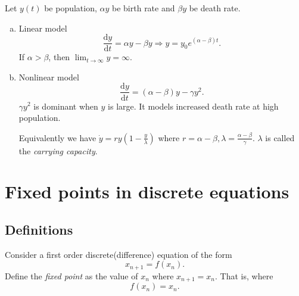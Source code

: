 \documentclass[10pt]{article}
\begin{document}
    \begin{example}
        Let $ y(t) $ be population, $ \alpha y $ be birth rate and $ \beta y $ be death rate.
        \begin{enumerate}[(a)]
            \item Linear model
            \[
                \frac{\mathrm{d}y}{\mathrm{d}t}=\alpha y-\beta y \Rightarrow y=y_{0}e^{(\alpha-\beta)t} 
            .\]
            If $ \alpha>\beta $, then $ \lim_{t \to \infty} y=\infty  $.
            \item Nonlinear model 
            \[
                \frac{\mathrm{d}y}{\mathrm{d}t} =(\alpha-\beta)y-\gamma y^2
            .\]
            $ \gamma y^2 $ is dominant when $y$ is large. It models increased death rate at high population.

            Equivalently we have $  \dot{y}=ry(1-\frac{y}{\lambda}) $ where $ r=\alpha-\beta, \lambda=\frac{\alpha-\beta}{\gamma} $. $ \lambda $ is called the \textit{carrying capacity}.
            \begin{center}
              \end{center}
        \end{enumerate}
    \end{example}
    \section{Fixed points in discrete equations}
    \subsection{Definitions}
    Consider a first order discrete(difference) equation of the form 
    \[
        x_{n+1}=f(x_n)
    .\]
    Define the \textit{fixed point} as the value of $x_n$ where $ x_{n+1}=x_n $. That is, where
    \[
        f(x_n)=x_n
    .\]
\end{document}
